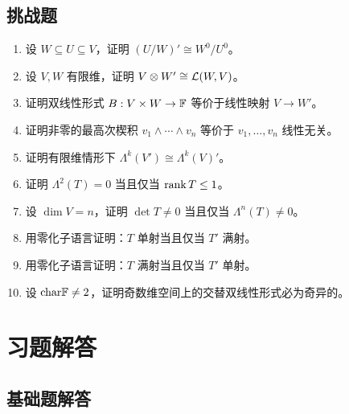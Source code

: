 \subsection*{挑战题}




\begin{enumerate}[resume, label=\textbf{\arabic*.}, leftmargin=*, itemsep=0.5em] \item \hard 设 $W\subseteq U\subseteq V$，证明 $(U/W)'\cong W^0/U^0$。 \item \hard 设 $V,W$ 有限维，证明 $V\otimes W'\cong \mathcal{L}(W,V)$。 \item \hard 证明双线性形式 $B:V\times W\to\mathbb{F}$ 等价于线性映射 $V\to W'$。 \item \hard 证明非零的最高次楔积 $v_1\wedge\cdots\wedge v_n$ 等价于 $v_1,\dots,v_n$ 线性无关。 \item \hard 证明有限维情形下 $\Lambda^k(V')\cong \Lambda^k(V)'$。 \item \hard 证明 $\Lambda^2(T)=0$ 当且仅当 $\operatorname{rank} T\leq 1$。 \item \hard 设 $\dim V=n$，证明 $\det T\neq 0$ 当且仅当 $\Lambda^n(T)\neq 0$。 \item \hard 用零化子语言证明：$T$ 单射当且仅当 $T'$ 满射。 \item \hard 用零化子语言证明：$T$ 满射当且仅当 $T'$ 单射。 \item \hard 设 $\mathrm{char}\mathbb{F}\neq 2$，证明奇数维空间上的交替双线性形式必为奇异的。 \end{enumerate}




\section*{习题解答}




\subsection*{基础题解答}





